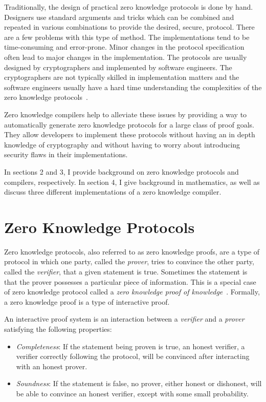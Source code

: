 \documentclass{sig-alternate}
\begin{document}
	Traditionally, the design of practical zero knowledge protocols
	is done by hand. Designers use standard arguments and tricks which
	can be combined and repeated in various combinations to provide the 
	desired, secure, protocol. There are a few problems with this type
	of method. The implementations tend to be time-consuming
	and error-prone. Minor changes in the protocol specification often
	lead to major changes in the implementation. The protocols are usually
	designed by cryptographers and implemented by software engineers. The
	cryptographers are not typically skilled in implementation matters and
	the software engineers usually have a hard time understanding the
	complexities of the zero knowledge protocols~\cite{Sigma:2009}. 

	Zero knowledge compilers help to alleviate these issues by providing
	a way to automatically generate zero knowledge protocols for a large
	class of proof goals. They allow developers to implement these protocols
	without having an in depth knowledge of cryptography and without having to
	worry about introducing security flaws in their implementations.

	In sections 2 and 3, I provide background on zero knowledge protocols and
	compilers, respectively. In section 4, I give background in
	mathematics, as well as discuss three different implementations of a zero knowledge 
	compiler.

\section{Zero Knowledge Protocols}
	Zero knowledge protocols, also referred to as zero knowledge proofs, are a type
	of protocol in which one party, called the \textit{prover}, tries to convince the 
	other party, called the \textit{verifier}, that a given statement is true. Sometimes
	the statement is that the prover possesses a particular piece of information. This
	is a special case of zero knowledge protocol called a \textit{zero knowledge proof
	of knowledge}~\cite{Wiki}. Formally, a zero knowledge proof is a type of interactive
	proof.
	
	An interactive proof system is an interaction between a
	\textit{verifier} and
	a \textit{prover} satisfying the following properties:
			
	\begin{itemize}
		\item \textit{Completeness}: If the statement being proven is true, an
		honest verifier, a verifier correctly following the protocol, will be
		convinced after interacting with an honest prover.
			
		\item \textit{Soundness}: If the statement is false, no prover, either
		honest or dishonest, will be able to convince an honest verifier, except
		with some small probability.
	\end{itemize}
	
\end{document}
